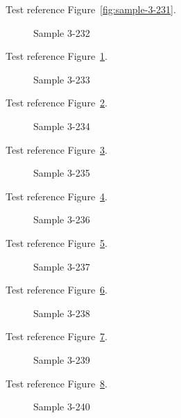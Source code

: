 Test reference Figure~\ref{fig:sample-3-231}.

\begin{figure}[tbhp]
\caption{Sample 3-232}
\label{fig:sample-3-232}
\end{figure}

Test reference Figure~\ref{fig:sample-3-232}.

\begin{figure}[tbhp]
\caption{Sample 3-233}
\label{fig:sample-3-233}
\end{figure}

Test reference Figure~\ref{fig:sample-3-233}.

\begin{figure}[tbhp]
\caption{Sample 3-234}
\label{fig:sample-3-234}
\end{figure}

Test reference Figure~\ref{fig:sample-3-234}.

\begin{figure}[tbhp]
\caption{Sample 3-235}
\label{fig:sample-3-235}
\end{figure}

Test reference Figure~\ref{fig:sample-3-235}.

\begin{figure}[tbhp]
\caption{Sample 3-236}
\label{fig:sample-3-236}
\end{figure}

Test reference Figure~\ref{fig:sample-3-236}.

\begin{figure}[tbhp]
\caption{Sample 3-237}
\label{fig:sample-3-237}
\end{figure}

Test reference Figure~\ref{fig:sample-3-237}.

\begin{figure}[tbhp]
\caption{Sample 3-238}
\label{fig:sample-3-238}
\end{figure}

Test reference Figure~\ref{fig:sample-3-238}.

\begin{figure}[tbhp]
\caption{Sample 3-239}
\label{fig:sample-3-239}
\end{figure}

Test reference Figure~\ref{fig:sample-3-239}.

\begin{figure}[tbhp]
\caption{Sample 3-240}
\label{fig:sample-3-240}
\end{figure}

